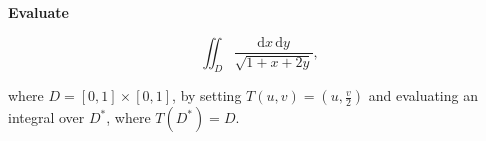 \textbf{Evaluate}

\[
\iint_D \frac{\mathrm{d}x \, \mathrm{d}y}{\sqrt{1+x+2y}},
\]

where \(D = [0,1] \times [0,1]\), by setting \(T(u,v) = (u, \frac{v}{2})\) and evaluating an integral over \(D^*\), where \(T(D^*) = D\).
